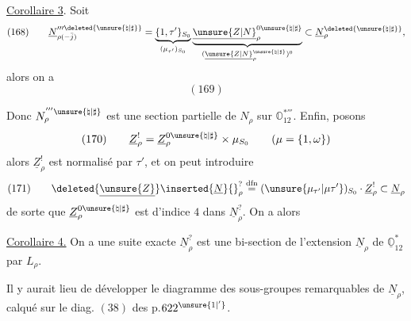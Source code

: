 \uline{Corollaire 3}. Soit
\[
(168)\qquad
\underline N_{\rho(-\bar j)}^{\prime\prime\prime\deleted{\unsure{\natural|\sharp}}}
=\underbrace{\{1,\tau'\}_{S_0}}_{(\mu_{\tau'})_{S_0}}
\underbrace{\underline{\unsure{Z|N}}_\rho^{0\unsure{\natural|\sharp}}}_{(\underline{\unsure{Z|N}}_\rho^{\unsure{\natural|\sharp}})^0}
\subset\underline N_\rho^{\deleted{\unsure{\natural|\sharp}}},
\]
alors on a
\[
(169)
\]


Donc \(N_\rho^{'''\unsure{\natural|\sharp}}\) est une section partielle de \(N_\rho\)
sur \(\mathbb O_{12}^{*'''}\). Enfin, posons
\[
(170)\qquad
\underline Z_\rho^{!}
=\underline Z_\rho^{0\unsure{\natural|\sharp}}\times\mu_{S_0}
\qquad(\mu=\{1,\omega\})
\]
alors \(\underline Z_\rho^!\) est normalisé par \(\tau'\), et
on peut introduire
\[
(171)\qquad
\deleted{\underline{\unsure{Z}}}\inserted{\underline N}{}_\rho^{?}
\mathrel{\overset{\mathrm{dfn}}{=}}
(\unsure{\mu_{\tau'}|\mu\tau'})_{S_0}\cdot\underline Z_\rho^!
\subset\underline N_\rho
\]
de sorte que \(\underline Z_\rho^{0\unsure{\natural|\sharp}}\) est d'indice \(4\)
dans \(\underline N_\rho^{?}\). On a alors

\uline{Corollaire 4.} On a une suite exacte
\(\underline N_\rho^{?}\) est une bi-section de l'extension
\(\underline N_\rho\) de \(\underline{\mathbb O}_{12}^{*}\) par \(L_\rho\).

Il y aurait lieu de développer le diagramme des sous-groupes
remarquables de \(\underline N_\rho\), calqué sur
le diag. \((38)\) des p.\(622^{\unsure{1|'}}\).

